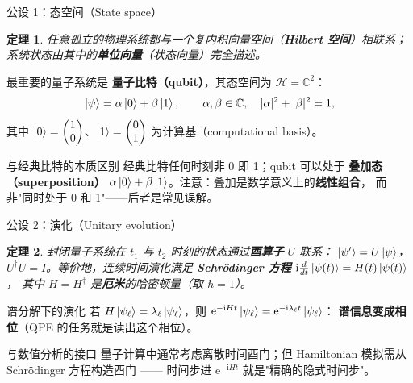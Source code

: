 \documentclass[aspectratio=169,10pt]{ctexbeamer}
\newcommand{\C}{\mathbb{C}}
\newcommand{\ii}{\mathrm{i}}
\newcommand{\e}{\mathrm{e}}
\newcommand{\smallcite}[1]{\par\vspace{1.2mm}{\scriptsize\color{graytext}#1}}
\newtheorem*{Thm}{定理}
\begin{document}
\begin{frame}{公设 1：态空间（State space）}
\begin{Thm}
任意孤立的物理系统都与一个复内积向量空间（\textbf{Hilbert 空间}）相联系；
系统状态由其中的\textbf{单位向量}（状态向量）完全描述。
\end{Thm}
最重要的量子系统是 \textbf{量子比特（qubit）}，其态空间为 $\mathcal H=\C^2$：
\[
\ket{\psi}=\alpha\ket{0}+\beta\ket{1},\qquad \alpha,\beta\in\C,\quad |\alpha|^2+|\beta|^2=1,
\]
其中 $\ket{0}=\begin{pmatrix}1\\0\end{pmatrix}$、$\ket{1}=\begin{pmatrix}0\\1\end{pmatrix}$
为计算基（computational basis）。
\begin{warnbox}{与经典比特的本质区别}
经典比特任何时刻非 0 即 1；qubit 可以处于 \textbf{叠加态（superposition）}
$\alpha\ket0+\beta\ket1$。注意：叠加是数学意义上的\textbf{线性组合}，
而非"同时处于 0 和 1"——后者是常见误解。
\end{warnbox}
\end{frame}

\begin{frame}{公设 2：演化（Unitary evolution）}
\begin{Thm}
封闭量子系统在 $t_1$ 与 $t_2$ 时刻的状态通过\textbf{酉算子} $U$ 联系：
$\ket{\psi'}=U\ket{\psi}$，$U^\dagger U=I$。等价地，连续时间演化满足
\textbf{Schrödinger 方程} $\ii\frac{d}{dt}\ket{\psi(t)}=H(t)\ket{\psi(t)}$，
其中 $H=H^\dagger$ 是\textbf{厄米}的哈密顿量（取 $\hbar=1$）。
\end{Thm}
\begin{keybox}{谱分解下的演化}
若 $H\ket{\psi_\ell}=\lambda_\ell\ket{\psi_\ell}$，则
$\e^{-\ii Ht}\ket{\psi_\ell}=\e^{-\ii\lambda_\ell t}\ket{\psi_\ell}$：
\textbf{谱信息变成相位}（QPE 的任务就是读出这个相位）。
\end{keybox}
\begin{exbox}{与数值分析的接口}
量子计算中通常考虑离散时间酉门；但 Hamiltonian 模拟需从 Schrödinger 方程构造酉门
—— 时间步进 $\e^{-\ii Ht}$ 就是"精确的隐式时间步"。
\end{exbox}
\smallcite{day16 课件第 14--15 页。}
\end{frame}
\end{document}
